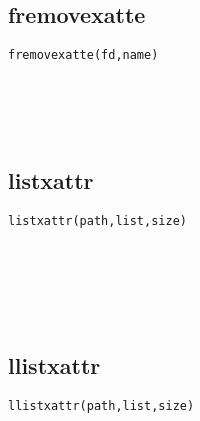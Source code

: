 \documentclass[10pt,a4paper]{article}
\begin{document}
\subsection{fremovexatte}
\begin{spacing}{2.0}
\lstset{language=C,numbers=none}
\begin{lstlisting}
fremovexatte(fd,name)
\end{lstlisting}
{\large\color[rgb]{0.2,0.4,0.6}{fd:}} \\
{\large\color[rgb]{0.2,0.4,0.6}{name:}}
\paragraph{ \ \ }
\end{spacing}

\subsection{listxattr}
\begin{spacing}{2.0}
\lstset{language=C,numbers=none}
\begin{lstlisting}
listxattr(path,list,size)
\end{lstlisting}
{\large\color[rgb]{0.2,0.4,0.6}{path:}} \\
{\large\color[rgb]{0.2,0.4,0.6}{list:}} \\
{\large\color[rgb]{0.2,0.4,0.6}{size:}}
\paragraph{ \ \ }
\end{spacing}

\subsection{llistxattr}
\begin{spacing}{2.0}
\lstset{language=C,numbers=none}
\begin{lstlisting}
llistxattr(path,list,size)
\end{lstlisting}
{\large\color[rgb]{0.2,0.4,0.6}{path:}} \\
{\large\color[rgb]{0.2,0.4,0.6}{list:}} \\
{\large\color[rgb]{0.2,0.4,0.6}{size:}}
\paragraph{ \ \ }
\end{spacing}
\end{document}
